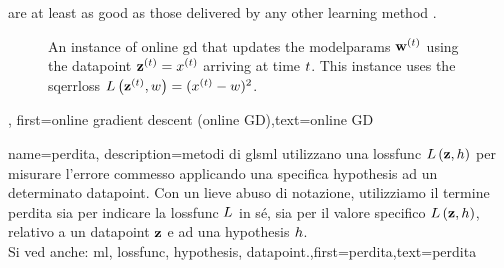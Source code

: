 {{are at least as good as those delivered by any other learning method \cite{HazanOCO,GDOptimalRakhlin2012}. 
\begin{figure}[H]
	\begin{center}
\end{center} 
\caption{An instance of online \gls{gd} that updates the \glspl{modelparam} ${\bf w}^{(t)}$ 
using the \gls{datapoint} ${\bf z}^{(t)} = x^{(t)}$ arriving at time $t$. 
This instance uses the \gls{sqerrloss} $L\left({\bf z}^{(t)},w \right) = (x^{(t)} - w)^{2}$.
}
\end{figure}},
first={online gradient descent (online GD)},text={online GD}}

	
{name={perdita}, 
	description={\I metodi di gls{ml} utilizzano una 
		\gls{lossfunc} $L\left({\bf z},h \right)$ per misurare l’errore commesso 
		applicando una specifica \gls{hypothesis} ad un determinato \gls{datapoint}. Con un lieve 
		abuso di notazione, utilizziamo il termine perdita sia per indicare la \gls{lossfunc} $L$ 
		in sé, sia per il valore specifico $L\left({\bf z},h \right)$, relativo a un \gls{datapoint} ${\bf z}$ 
		e ad una \gls{hypothesis} $h$.
				\\
		Si ved anche: \gls{ml}, \gls{lossfunc}, \gls{hypothesis}, \gls{datapoint}.},first={perdita},text={perdita} }

